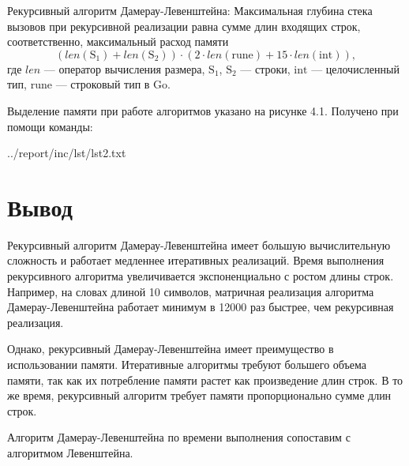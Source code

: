Рекурсивный алгоритм Дамерау-Левенштейна:
Максимальная глубина стека вызовов при рекурсивной реализации равна сумме длин входящих строк, соответственно, максимальный расход памяти
\begin{equation}
(len\mathrm{(S_1)} + len\mathrm{(S_2)}) \cdot (2 \cdot len\mathrm{(rune)} + 15 \cdot len\mathrm{(int)}),
\label{for:99}
\end{equation}
где $len$ --- оператор вычисления размера, $\mathrm{S_1}$, $\mathrm{S_2}$ --- строки, $\mathrm{int}$ --- целочисленный тип, $\mathrm{rune}$ --- строковый тип в Go.

Выделение памяти при работе алгоритмов указано на рисунке 4.1. Получено при помощи команды: 

\pagebreak

\begin{lstinputlisting}[
	caption={Матричный (Левенштейн)},
	label={lst:memory},
	style={sh},
	]{../report/inc/lst/lst2.txt}
\end{lstinputlisting}

\pagebreak

\section*{Вывод}

Рекурсивный алгоритм Дамерау-Левенштейна имеет большую вычислительную сложность и работает медленнее итеративных реализаций. Время выполнения рекурсивного алгоритма увеличивается экспоненциально с ростом длины строк. Например, на словах длиной 10 символов, матричная реализация алгоритма Дамерау-Левенштейна работает минимум  в 12000 раз быстрее, чем рекурсивная реализация.

Однако, рекурсивный Дамерау-Левенштейна имеет преимущество в использовании памяти. Итеративные алгоритмы требуют большего объема памяти, так как их потребление памяти растет как произведение длин строк. В то же время, рекурсивный алгоритм требует памяти пропорционально сумме длин строк.

Алгоритм Дамерау-Левенштейна по времени выполнения сопоставим с алгоритмом Левенштейна.

